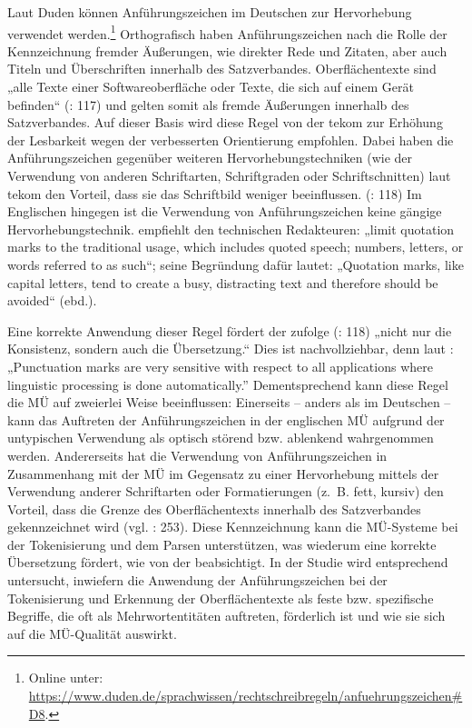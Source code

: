 Laut Duden können Anführungszeichen im Deutschen zur Hervorhebung verwendet werden.\footnote{{{{Online unter: \url{https://www.duden.de/sprachwissen/rechtschreibregeln/anfuehrungszeichen\#D8}.}}}} {Orthografisch haben Anführungszeichen nach} \citet[254]{Nerius2007} {die Rolle der Kennzeichnung fremder Äußerungen, wie direkter Rede und Zitaten, aber auch Titeln und Überschriften innerhalb des Satzverbandes.} {{Oberflächentexte sind „alle Texte einer Softwareoberfläche oder Texte, die sich auf einem Gerät befinden“ (\citealt{tekom2013}: 117)} }{und gelten somit als fremde Äußerungen innerhalb des Satzverbandes. Auf dieser Basis wird diese Regel von der tekom zur Erhöhung der Lesbarkeit wegen der verbesserten Orientierung empfohlen. Dabei haben die Anführungszeichen gegenüber weiteren Hervorhebungstechniken (wie der Verwendung von anderen Schriftarten, Schriftgraden oder Schriftschnitten) laut tekom den Vorteil, dass sie das Schriftbild weniger beeinflussen.} (\citealt{tekom2013}: 118) Im {E}nglischen {hingegen} ist die Verwendung von Anführungszeichen keine gängige Hervorhebungstechnik. {\citet{McMurrey2006} empfiehlt den technischen Redakteuren: „limit quotation marks to the traditional usage, which includes quoted speech; numbers, letters, or words referred to as such“; seine Begründung dafür lautet: „Quotation marks, like capital letters, tend to create a busy, distracting text and therefore should be avoided“ (ebd.).}

{Eine korrekte Anwendung dieser Regel fördert der \citeauthor{tekom2013} zufolge (\citeyear{tekom2013}: 118) „nicht nur die Konsistenz, sondern auch die Übersetzung.“ Dies ist nachvollziehbar, denn laut \citet[2]{Reuther2003}: „Punctuation marks are very sensitive with respect to all applications where linguistic processing is} done automatically.” Dementsprechend kann diese Regel die MÜ auf zweierlei Weise beeinflussen: Einerseits -- anders als im Deutschen -- kann das Auftreten der Anführungszeichen in der englischen MÜ aufgrund der untypischen Verwendung als optisch störend bzw. ablenkend wahrgenommen werden. Andererseits hat die Verwendung von Anführungszeichen in Zusammenhang mit der MÜ im Gegensatz zu einer Hervorhebung mittels der Verwendung anderer Schriftarten oder Formatierungen (z.~B. fett, kursiv) den Vorteil, dass die Grenze des Oberflächentexts innerhalb des Satzverbandes gekennzeichnet wird (vgl. \citealt{Nerius2007}: 253). Diese Kennzeichnung kann die MÜ-Systeme bei der Tokenisierung und dem Parsen unterstützen, was wiederum eine korrekte Übersetzung fördert, wie von der \citet[118]{tekom2013} beabsichtigt. In der Studie wird entsprechend untersucht, inwiefern die Anwendung der Anführungszeichen bei der Tokenisierung und Erkennung der Oberflächentexte als feste bzw. spezifische Begriffe, die oft als Mehrwortentitäten auftreten, förderlich ist und wie sie sich auf die MÜ-Qualität auswirkt.

